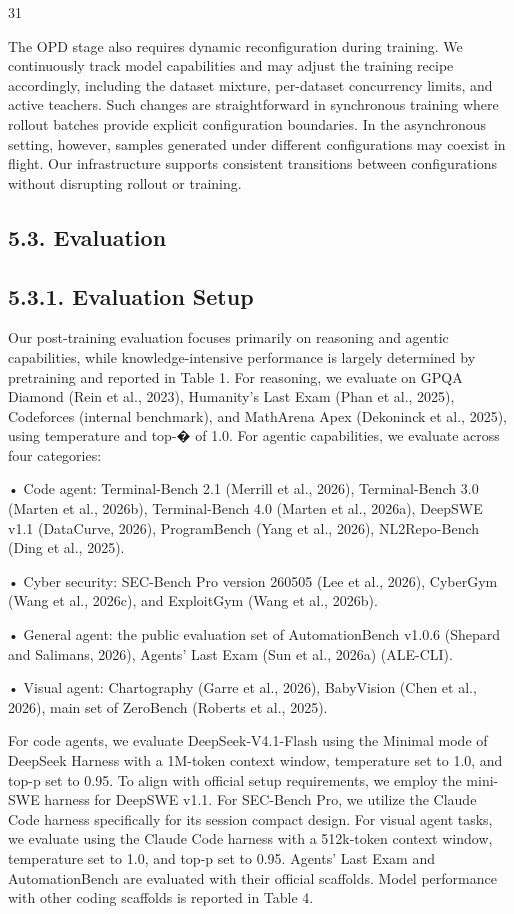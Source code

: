 \documentclass[
  10
]{article}
\begin{document}
31

The OPD stage also requires dynamic reconfiguration during training. We
continuously track model capabilities and may adjust the training recipe
accordingly, including the dataset mixture, per-dataset concurrency
limits, and active teachers. Such changes are straightforward in
synchronous training where rollout batches provide explicit
configuration boundaries. In the asynchronous setting, however, samples
generated under different configurations may coexist in flight. Our
infrastructure supports consistent transitions between configurations
without disrupting rollout or training.

\subsection{5.3. Evaluation}\label{evaluation}

\subsection{5.3.1. Evaluation Setup}\label{evaluation-setup}

Our post-training evaluation focuses primarily on reasoning and agentic
capabilities, while knowledge-intensive performance is largely
determined by pretraining and reported in Table 1. For reasoning, we
evaluate on GPQA Diamond (Rein et al., 2023), Humanity's Last Exam (Phan
et al., 2025), Codeforces (internal benchmark), and MathArena Apex
(Dekoninck et al., 2025), using temperature and top-� of 1.0. For
agentic capabilities, we evaluate across four categories:

• Code agent: Terminal-Bench 2.1 (Merrill et al., 2026), Terminal-Bench
3.0 (Marten et al., 2026b), Terminal-Bench 4.0 (Marten et al., 2026a),
DeepSWE v1.1 (DataCurve, 2026), ProgramBench (Yang et al., 2026),
NL2Repo-Bench (Ding et al., 2025).

• Cyber security: SEC-Bench Pro version 260505 (Lee et al., 2026),
CyberGym (Wang et al., 2026c), and ExploitGym (Wang et al., 2026b).

• General agent: the public evaluation set of AutomationBench v1.0.6
(Shepard and Salimans, 2026), Agents' Last Exam (Sun et al., 2026a)
(ALE-CLI).

• Visual agent: Chartography (Garre et al., 2026), BabyVision (Chen et
al., 2026), main set of ZeroBench (Roberts et al., 2025).

For code agents, we evaluate DeepSeek-V4.1-Flash using the Minimal mode
of DeepSeek Harness with a 1M-token context window, temperature set to
1.0, and top-p set to 0.95. To align with official setup requirements,
we employ the mini-SWE harness for DeepSWE v1.1. For SEC-Bench Pro, we
utilize the Claude Code harness specifically for its session compact
design. For visual agent tasks, we evaluate using the Claude Code
harness with a 512k-token context window, temperature set to 1.0, and
top-p set to 0.95. Agents' Last Exam and AutomationBench are evaluated
with their official scaffolds. Model performance with other coding
scaffolds is reported in Table 4.
\end{document}
